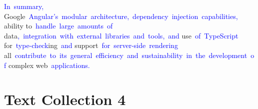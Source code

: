 \documentclass{article}
\begin{document}
\begin{tcolorbox}[colframe=black,colback=white]
\textcolor{blue}{In}\textcolor{blue}{~summary}\textcolor{blue}{,} Google\textcolor{blue}{~Angular}\textcolor{blue}{'s}\textcolor{blue}{~modular}\textcolor{blue}{~architecture}\textcolor{blue}{,}\textcolor{blue}{~dependency}\textcolor{blue}{~injection}\textcolor{blue}{~capabilities}\textcolor{blue}{,} ability to\textcolor{blue}{~handle}\textcolor{blue}{~large}\textcolor{blue}{~amounts}\textcolor{blue}{~of} data\textcolor{blue}{,}\textcolor{blue}{~integration}\textcolor{blue}{~with}\textcolor{blue}{~external}\textcolor{blue}{~libraries}\textcolor{blue}{~and}\textcolor{blue}{~tools}\textcolor{blue}{,}\textcolor{blue}{~and} use\textcolor{blue}{~of}\textcolor{blue}{~TypeScript} for\textcolor{blue}{~type}\textcolor{blue}{-check}ing\textcolor{blue}{~and} support\textcolor{blue}{~for}\textcolor{blue}{~server}\textcolor{blue}{-side}\textcolor{blue}{~rendering} all\textcolor{blue}{~contribute}\textcolor{blue}{~to}\textcolor{blue}{~its}\textcolor{blue}{~general}\textcolor{blue}{~efficiency}\textcolor{blue}{~and}\textcolor{blue}{~sustainability}\textcolor{blue}{~in}\textcolor{blue}{~the}\textcolor{blue}{~development}\textcolor{blue}{~of} complex web\textcolor{blue}{~applications}\textcolor{blue}{.}\textcolor{blue}{}
\end{tcolorbox}


\section*{Text Collection 4}
\end{document}
